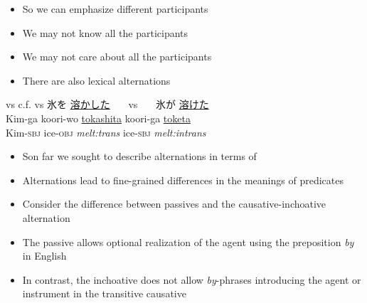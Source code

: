 \documentclass[headrule,footrule]{foils}
\begin{document}

\begin{itemize}
\item So we can emphasize different participants
\item We may not know all the participants
\item We may not care about all the participants
\item There are also lexical alternations
\end{itemize}
\begin{exe}
\ex {} vs 
\ex c.f.  vs 
\makexeCJKactive
\ex \glll {} 氷を \ul{溶かした}  {~~~vs~~~}  氷が \ul{溶けた} \\ 
\makexeCJKinactive
Kim-ga koori-wo \ul{tokashita}  {} koori-ga \ul{toketa} \\
  Kim-\textsc{sbj} ice-\textsc{obj} \textit{melt:trans} 
{} ice-\textsc{sbj} \textit{melt:intrans} \\
\end{exe}



\begin{itemize}
\item Son far we sought to describe alternations in terms of 
\item Alternations lead to fine-grained differences in the meanings of predicates 
\item Consider the difference between passives and the causative-inchoative alternation

\end{itemize}


\begin{itemize}
\item The passive allows optional realization of the agent using the preposition \emph{by} in English
\item In contrast, the inchoative does not allow \emph{by}-phrases introducing the agent or instrument in the transitive causative
\end{itemize}
\end{document}
